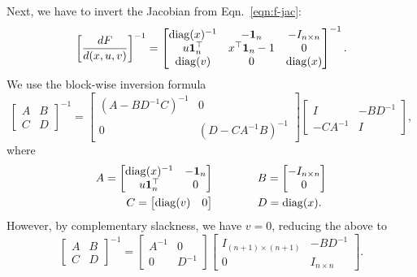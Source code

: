 \documentclass[11pt]{article}
\begin{document}
Next, we have to invert the Jacobian from Eqn.~\ref{eqn:f-jac}:
\begin{equation}
\label{eqn:dsystem-matrix}
\left[\frac{dF}{d(x,u,v)}\right]^{-1} = \begin{bmatrix}
\mathrm{diag}(x)^{-1} & -\mathbf{1}_n & -I_{n\times n} \\
u\mathbf{1}_n^\top & x^\top\mathbf{1}_n - 1 & 0\\
\mathrm{diag}(v) & 0 & \mathrm{diag}(x)
\end{bmatrix}^{-1}.
\end{equation}
We use the block-wise inversion formula
\begin{equation*}
\begin{bmatrix}
A & B\\
C & D
\end{bmatrix}^{-1} = \begin{bmatrix}
    (A - BD^{-1}C)^{-1} & 0\\
    0 & (D - CA^{-1}B)^{-1}
\end{bmatrix}
\begin{bmatrix}
    I & -BD^{-1}\\
    -CA^{-1} & I
\end{bmatrix},
\end{equation*}
where
\begin{align*}
A = \begin{bmatrix} \mathrm{diag}(x)^{-1} & -\mathbf{1}_n \\ u\mathbf{1}_n^\top & 0 \end{bmatrix}&\qquad\qquad
B = \begin{bmatrix}-I_{n\times n} \\ 0\end{bmatrix}\\
C = \begin{bmatrix}\mathrm{diag}(v) & 0\end{bmatrix} &\qquad\qquad
D = \mathrm{diag}(x).
\end{align*}
However, by complementary slackness, we have $v = 0$, reducing the above to
\begin{equation*}
\begin{bmatrix}
A & B\\
C & D
\end{bmatrix}^{-1} = \begin{bmatrix}
    A^{-1} & 0\\
    0 & D^{-1}
\end{bmatrix}
\begin{bmatrix}
    I_{(n+1)\times (n+1)} & -BD^{-1}\\
    0 & I_{n \times n}
\end{bmatrix}.
\end{equation*}
\end{document}
